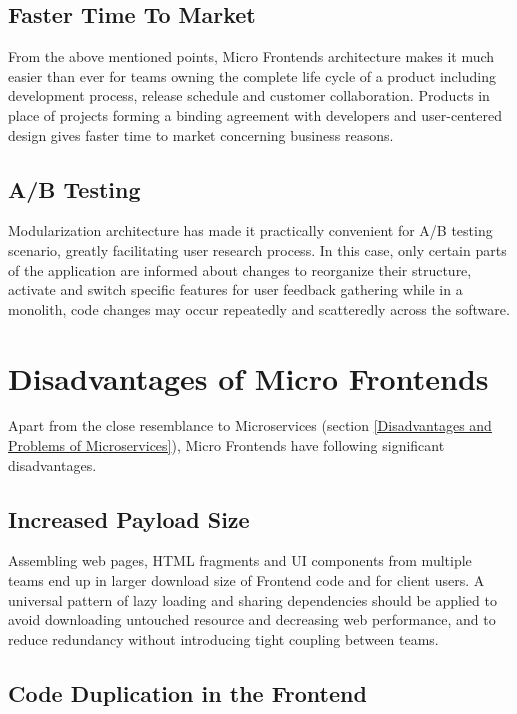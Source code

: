 \documentclass[a4paper]{book}
\begin{document}
\subsection{Faster Time To Market}
From the above mentioned points, Micro Frontends architecture makes it much easier than ever for teams owning the complete life cycle of a product including development process, release schedule and customer collaboration. Products in place of projects forming a binding agreement with developers and user-centered design gives faster time to market concerning business reasons.

\subsection{A/B Testing}
Modularization architecture has made it practically convenient for A/B testing scenario, greatly facilitating  user research process. In this case, only certain parts of the application are informed about changes to reorganize their structure, activate and switch specific features for user feedback gathering while in a monolith, code changes may occur repeatedly and scatteredly across the software. \cite{Rap20}

\section{Disadvantages of Micro Frontends}

Apart from the close resemblance to Microservices (section \ref{Disadvantages and Problems of Microservices}), Micro Frontends have following significant disadvantages.

\subsection{Increased Payload Size}

Assembling web pages, HTML fragments and UI components from multiple teams end up in larger download size of Frontend code and for client users. A universal pattern of lazy loading and sharing dependencies should be applied to avoid downloading untouched resource and decreasing web performance, and to reduce redundancy without introducing tight coupling between teams. 

\subsection{Code Duplication in the Frontend}
\end{document}
